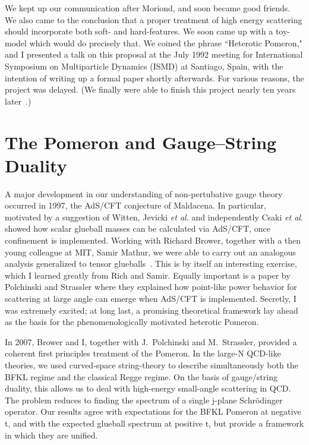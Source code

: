 \documentclass[11pt, oneside]{article}   	%
\newcommand{\<}{\langle}
\renewcommand{\>}{\rangle}
\numberwithin{equation}{section}
\numberwithin{figure}{section}
\begin{document}
We kept up our communication after Moriond, and soon became good friends. We also came to the conclusion that a proper  treatment of high energy scattering should incorporate both soft- and hard-features. We soon came up with a toy-model which would do precisely that. We coined the phrase ``Heterotic Pomeron," and I presented a talk on this proposal at the July 1992 meeting for International Symposium on Multiparticle Dynamics (ISMD)  at Santiago, Spain, with the intention of writing up a formal paper shortly afterwards.  For various reasons, the project was delayed. (We finally were able to finish this project nearly ten years later~\cite{Levin:1992ys}.) 



\section{The Pomeron and Gauge--String Duality}

A major development in our understanding of non-pertubative gauge theory occurred in 1997, the AdS/CFT conjecture of Maldacena.  In particular, motivated by a suggestion of Witten, Jevicki {\it et al.} and independently  Csaki {\it et al.} showed how scalar glueball masses can be calculated via AdS/CFT, once  confinement is implemented.  Working with  Richard Brower, together with a then young colleague at MIT, Samir Mathur, we were able to carry out an analogous analysis generalized to tensor glueballs~\cite{Brower:2000rp}. This is by itself an interesting exercise, which I learned greatly from Rich and Samir. Equally important is a paper by Polchinski and Strassler where they explained how point-like power behavior for scattering at large angle can emerge when AdS/CFT is implemented.  
Secretly, I was extremely excited; at long last, a promising theoretical framework lay ahead as the basis for the phenomenologically motivated heterotic Pomeron. 

In 2007, Brower and I,  together with J.~Polchinski and M.~Strassler\cite{Brower:2006ea},
 provided  a coherent first principles treatment of the Pomeron. In the large-N QCD-like theories, we used curved-space string-theory to describe simultaneously both the BFKL regime and the classical Regge regime. On  the basis of gauge/string duality,  this allows us to deal with  high-energy small-angle scattering in QCD.  The problem reduces to finding the spectrum of a single j-plane Schr\"odinger operator.  Our results agree with expectations for the BFKL Pomeron at negative t, and  with the expected glueball spectrum at positive t, but provide a framework in which they are unified.  
 
\end{document}
